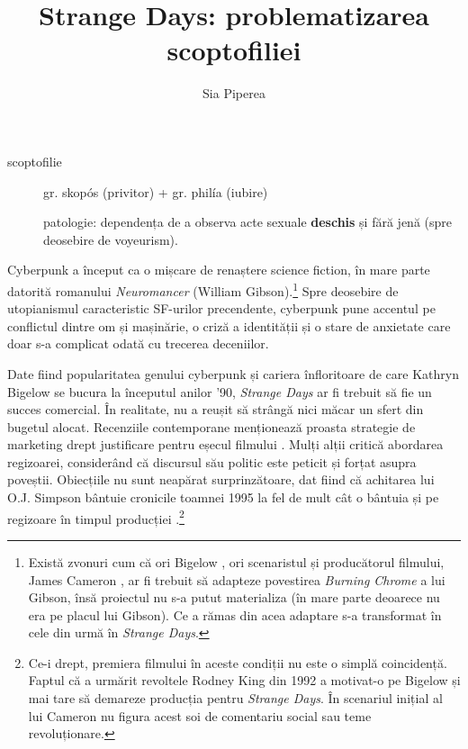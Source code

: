 \documentclass[12pt]{article}
\title{\textbf{Strange Days: problematizarea scoptofiliei}}
\author{Sia Piperea}
\date{} %
\begin{document}
	 	
\maketitle

\begin{description}
	\item[scoptofilie]\par
	gr. skopós (privitor) + gr. philía (iubire) \par
	patologie: dependența de a observa acte sexuale  \textbf{deschis} și fără jenă (spre deosebire de voyeurism). \par
\end{description}
		 	
Cyberpunk a început ca o mișcare de renaștere science fiction, în mare parte datorită romanului \textit{Neuromancer} (William Gibson).\footnote{Există zvonuri cum că ori Bigelow \cite{Salza1994a}, ori scenaristul și producătorul filmului, James Cameron \cite{Henry2023a}, ar fi trebuit să adapteze povestirea \textit{Burning Chrome} a lui Gibson, însă proiectul nu s-a putut materializa (în mare parte deoarece nu era pe placul lui Gibson). Ce a rămas din acea adaptare s-a transformat în cele din urmă în \textit{Strange Days}.} Spre deosebire de utopianismul caracteristic SF-urilor precendente, cyberpunk pune accentul pe conflictul dintre om și mașinărie, o criză a identității și o stare de anxietate care doar s-a complicat odată cu trecerea deceniilor.\par

Date fiind popularitatea genului cyberpunk și cariera înfloritoare de care Kathryn Bigelow se bucura la începutul anilor '90, \textit{Strange Days} ar fi trebuit să fie un succes comercial. În realitate, nu a reușit să strângă nici măcar un sfert din bugetul alocat. Recenziile contemporane menționează proasta strategie de marketing drept justificare pentru eșecul filmului \cite{McCarthy1995a}. Mulți alții critică abordarea regizoarei, considerând că discursul său politic este peticit și forțat asupra poveștii. Obiecțiile nu sunt neapărat surprinzătoare, dat fiind că achitarea lui O.J. Simpson bântuie cronicile toamnei 1995 la fel de mult cât o bântuia și pe regizoare în timpul producției \cite{Willistein1995a}.\footnote{Ce-i drept, premiera filmului în aceste condiții nu este o simplă coincidență. Faptul că a urmărit revoltele Rodney King din 1992 a motivat-o pe Bigelow și mai tare să demareze producția pentru \textit{Strange Days}. În scenariul inițial al lui Cameron nu figura acest soi de comentariu social sau teme revoluționare.}\par
\end{document}
